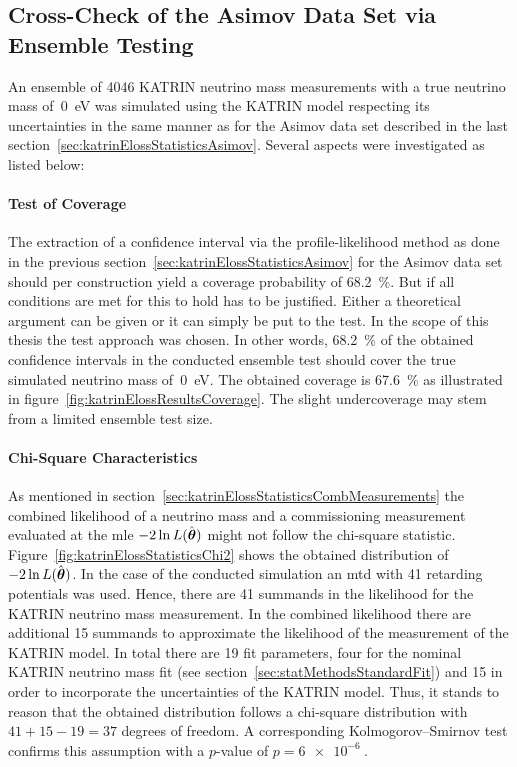 \subsection{Cross-Check of the Asimov Data Set via Ensemble Testing}
\label{sec:katrinElossModelResultsEnsemble}
An ensemble of 4046 KATRIN neutrino mass measurements with a true neutrino mass of~\SI{0}{eV} was simulated using the KATRIN model respecting its uncertainties in the same manner as for the Asimov data set described in the last section~\ref{sec:katrinElossStatisticsAsimov}. Several aspects were investigated as listed below:
\paragraph{Test of Coverage}
The extraction of a confidence interval via the profile-likelihood method as done in the previous section~\ref{sec:katrinElossStatisticsAsimov} for the Asimov data set should per construction yield a coverage probability of \SI{68.2}{\percent}. But if all conditions are met for this to hold has to be justified. Either a theoretical argument can be given or it can simply be put to the test. In the scope of this thesis the test approach was chosen. In other words, \SI{68.2}{\percent} of the obtained confidence intervals in the conducted ensemble test should cover the true simulated neutrino mass of~\SI{0}{eV}. The obtained coverage is \SI{67.6}{\percent} as illustrated in figure~\ref{fig:katrinElossResultsCoverage}. The slight undercoverage may stem from a limited ensemble test size.

\paragraph{Chi-Square Characteristics}
As mentioned in section~\ref{sec:katrinElossStatisticsCombMeasurements} the combined likelihood of a neutrino mass and a commissioning measurement evaluated at the \gls{mle} $-2\ln L(\hat{\boldsymbol{\mathbf{\theta}}})$ might not follow the chi-square statistic. Figure~\ref{fig:katrinElossStatisticsChi2} shows the obtained distribution of $-2\ln L(\hat{\boldsymbol{\mathbf{\theta}}})$. In the case of the conducted simulation an \gls{mtd} with 41 retarding potentials was used. Hence, there are 41 summands in the likelihood for the KATRIN neutrino mass measurement. In the combined likelihood there are additional 15 summands to approximate the likelihood of the measurement of the KATRIN model. In total there are 19 fit parameters, four for the nominal KATRIN neutrino mass fit (see section~\ref{sec:statMethodsStandardFit}) and 15 in order to incorporate the uncertainties of the KATRIN model. Thus, it stands to reason that the obtained distribution follows a chi-square distribution with $41+15-19=37$ degrees of freedom. A corresponding Kolmogorov–Smirnov test confirms this assumption with a $p$-value of $p=\SI{6e-6}{}$.

